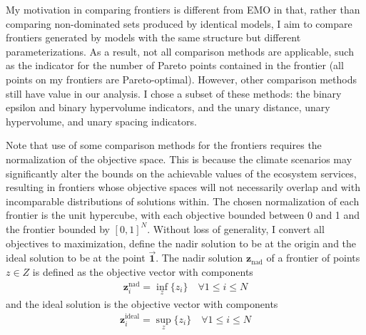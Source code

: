 My motivation in comparing frontiers is different from EMO in that, rather than comparing non-dominated sets produced by identical models, I aim to compare frontiers generated by models with the same structure but different parameterizations. As a result, not all comparison methods are applicable, such as the indicator for the number of Pareto points contained in the frontier (all points on my frontiers are Pareto-optimal). However, other comparison methods still have value in our analysis. I chose a subset of these methods: the binary epsilon and binary hypervolume indicators, and the unary distance, unary hypervolume, and unary spacing indicators.

Note that use of some comparison methods for the frontiers requires the normalization of the objective space. This is because the climate scenarios may significantly alter the bounds on the achievable values of the ecosystem services, resulting in frontiers whose objective spaces will not necessarily overlap and with incomparable distributions of solutions within. The chosen normalization of each frontier is the unit hypercube, with each objective bounded between 0 and 1 and the frontier bounded by $[0,1]^N$. Without loss of generality, I convert all objectives to maximization, define the nadir solution to be at the origin and the ideal solution to be at the point $\vec{\mathbf{1}}$. The nadir solution $\mathbf{z}_{\text{nad}}$ of a frontier of points $z \in Z$ is defined as the objective vector with components
\begin{align}
\mathbf{z}_i^{\text{nad}} = \inf_{z} \{ z_i \} \quad \forall 1 \le i \le N
\end{align}
and the ideal solution is the objective vector with components
\begin{align}
\mathbf{z}_i^{\text{ideal}} = \sup_{z} \{ z_i \} \quad \forall 1 \le i \le N
\end{align}

